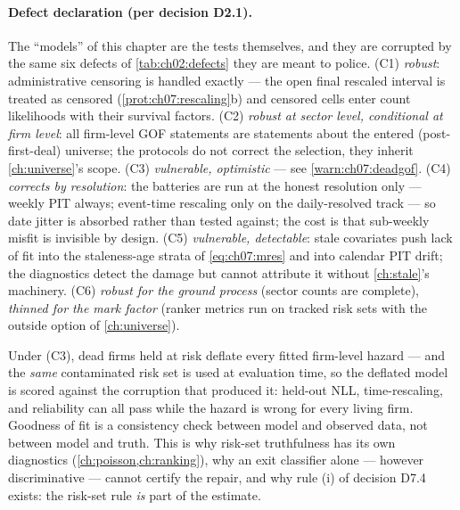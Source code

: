 \paragraph{Defect declaration (per decision D2.1).}
The ``models'' of this chapter are the tests themselves, and they are
corrupted by the same six defects of \cref{tab:ch02:defects} they are
meant to police. (C1) \emph{robust}: administrative censoring is handled
exactly --- the open final rescaled interval is treated as censored
(\cref{prot:ch07:rescaling}b) and censored cells enter count likelihoods
with their survival factors. (C2) \emph{robust at sector level,
conditional at firm level}: all firm-level GOF statements are statements
about the entered (post-first-deal) universe; the protocols do not
correct the selection, they inherit \cref{ch:universe}'s scope. (C3)
\emph{vulnerable, optimistic} --- see \cref{warn:ch07:deadgof}. (C4)
\emph{corrects by resolution}: the batteries are run at the honest
resolution only --- weekly PIT always; event-time rescaling only on the
daily-resolved track --- so date jitter is absorbed rather than tested
against; the cost is that sub-weekly misfit is invisible by design. (C5)
\emph{vulnerable, detectable}: stale covariates push lack of fit into the
staleness-age strata of \cref{eq:ch07:mres} and into calendar PIT drift;
the diagnostics detect the damage but cannot attribute it without
\cref{ch:stale}'s machinery. (C6) \emph{robust for the ground process}
(sector counts are complete), \emph{thinned for the mark factor} (ranker
metrics run on tracked risk sets with the outside option of
\cref{ch:universe}).

\begin{warning}\label{warn:ch07:deadgof}
Under (C3), dead firms held at risk deflate every fitted firm-level
hazard --- and the \emph{same} contaminated risk set is used at
evaluation time, so the deflated model is scored against the corruption
that produced it: held-out NLL, time-rescaling, and reliability can all
pass while the hazard is wrong for every living firm. Goodness of fit is
a consistency check between model and observed data, not between model
and truth. This is why risk-set truthfulness has its own diagnostics
(\cref{ch:poisson,ch:ranking}), why an exit classifier alone --- however
discriminative --- cannot certify the repair, and why rule (i) of
decision D7.4 exists: the risk-set rule \emph{is} part of the estimate.
\end{warning}

